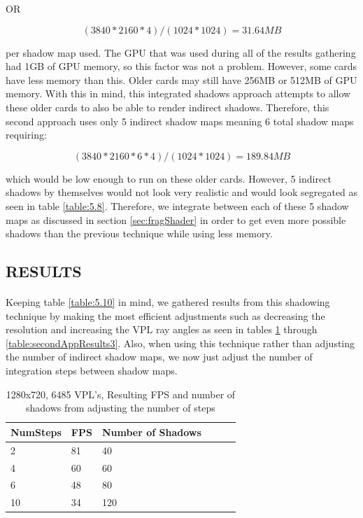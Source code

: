 OR

\begin{equation}
(3840*2160*4)/(1024*1024) = 31.64 MB
\end{equation}

per shadow map used.  The GPU that was used during all of the results gathering had 1GB of GPU memory, so this factor was not a problem.  However, some cards have less memory than this.  Older cards may still have 256MB or 512MB of GPU memory.  With this in mind, this integrated shadows approach attempts to allow these older cards to also be able to render indirect shadows.  Therefore, this second approach uses only 5 indirect shadow maps meaning 6 total shadow maps requiring:

\begin{equation}
(3840*2160*6*4)/(1024*1024) = 189.84 MB
\end{equation}

which would be low enough to run on these older cards.  However, 5 indirect shadows by themselves would not look very realistic and would look segregated as seen in table \ref{table:5.8}.  Therefore, we integrate between each of these 5 shadow maps as discussed in section \ref{sec:fragShader} in order to get even more possible shadows than the previous technique while using less memory.

\subsection{RESULTS}
\paragraph{}
Keeping table \ref{table:5.10} in mind, we gathered results from this shadowing technique by making the most efficient adjustments such as decreasing the resolution and increasing the VPL ray angles as seen in tables \ref{table:secondAppResults1} through \ref{table:secondAppResults3}.  Also, when using this technique rather than adjusting the number of indirect shadow maps, we now just adjust the number of integration steps between shadow maps.

\begin{table}[h!]
	\caption{1280x720, 6485 VPL's, Resulting FPS and number of shadows from adjusting the number of steps}
	\begin{center}
	    \begin{tabular}{ | l | l | l | l | l | l |}
	    \hline
	    NumSteps & FPS & Number of Shadows\\ \hline
	    2 & 81 & 40\\ \hline
	    4 & 60 & 60\\ \hline
	    6 & 48 & 80\\ \hline
	    10 & 34 & 120\\ \hline
	    \end{tabular}
	\end{center}
	\label{table:secondAppResults1}
\end{table}

